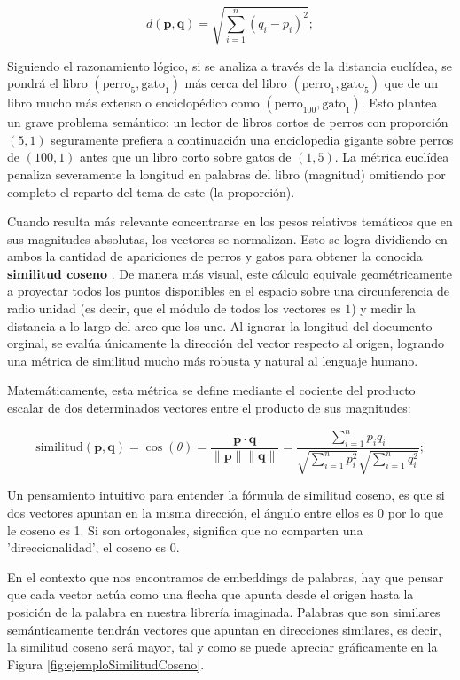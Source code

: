 \[
  d(\mathbf{p}, \mathbf{q}) = \sqrt{\sum_{i=1}^{n} (q_i - p_i)^2};
\]

Siguiendo el razonamiento lógico, si se analiza a través de la distancia euclídea, se pondrá el libro $(\text{perro}_5, \text{gato}_1)$ más cerca del libro $(\text{perro}_1, \text{gato}_5)$ que de un libro mucho más extenso o enciclopédico como $(\text{perro}_{100}, \text{gato}_1)$. Esto plantea un grave problema semántico: un lector de libros cortos de perros con proporción $(5, 1)$ seguramente prefiera a continuación una enciclopedia gigante sobre perros de $(100, 1)$ antes que un libro corto sobre gatos de $(1, 5)$. La métrica euclídea penaliza severamente la longitud en palabras del libro (magnitud) omitiendo por completo el reparto del tema de este (la proporción).

Cuando resulta más relevante concentrarse en los pesos relativos temáticos que en sus magnitudes absolutas, los vectores se normalizan. Esto se logra dividiendo en ambos la cantidad de apariciones de perros y gatos para obtener la conocida \textbf{similitud coseno} \cite{porter_understanding_2023}. De manera más visual, este cálculo equivale geométricamente a proyectar todos los puntos disponibles en el espacio sobre una circunferencia de radio unidad (es decir, que el módulo de todos los vectores es $1$) y medir la distancia a lo largo del arco que los une. Al ignorar la longitud del documento orginal, se evalúa únicamente la dirección del vector respecto al origen, logrando una métrica de similitud mucho más robusta y natural al lenguaje humano.

Matemáticamente, esta métrica se define mediante el cociente del producto escalar de dos determinados vectores entre el producto de sus magnitudes:

\[
  \text{similitud}(\mathbf{p}, \mathbf{q}) = \cos(\theta) = \frac{\mathbf{p} \cdot \mathbf{q}}{\|\mathbf{p}\| \|\mathbf{q}\|} = \frac{\sum_{i=1}^{n} p_i q_i}{\sqrt{\sum_{i=1}^{n} p_i^2} \sqrt{\sum_{i=1}^{n} q_i^2}};
\]

Un pensamiento intuitivo para entender la fórmula de similitud coseno, es que si dos vectores apuntan en la misma dirección, el ángulo entre ellos es 0 por lo que le coseno es 1. Si son ortogonales, significa que no comparten una 'direccionalidad', el coseno es 0.

En el contexto que nos encontramos de embeddings de palabras, hay que pensar que cada vector actúa como una flecha que apunta desde el origen hasta la posición de la palabra en nuestra librería imaginada. Palabras que son similares semánticamente tendrán vectores que apuntan en direcciones similares, es decir, la similitud coseno será mayor, tal y como se puede apreciar gráficamente en la Figura \ref{fig:ejemploSimilitudCoseno}.

